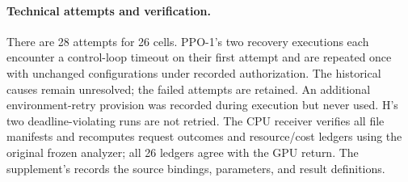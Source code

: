\paragraph{Technical attempts and verification.}
There are 28 attempts for 26 cells. PPO-1's two recovery executions each
encounter a control-loop timeout on their first attempt and are repeated
once with unchanged configurations under recorded authorization. The
historical causes remain unresolved; the failed attempts are retained.
An additional environment-retry provision was recorded during execution
but never used. H's two deadline-violating runs are not retried.
The CPU receiver verifies all file manifests and recomputes request
outcomes and resource/cost ledgers using the original frozen analyzer;
all 26 ledgers agree with the GPU return. The supplement's
 records the source bindings, parameters,
and result definitions.
